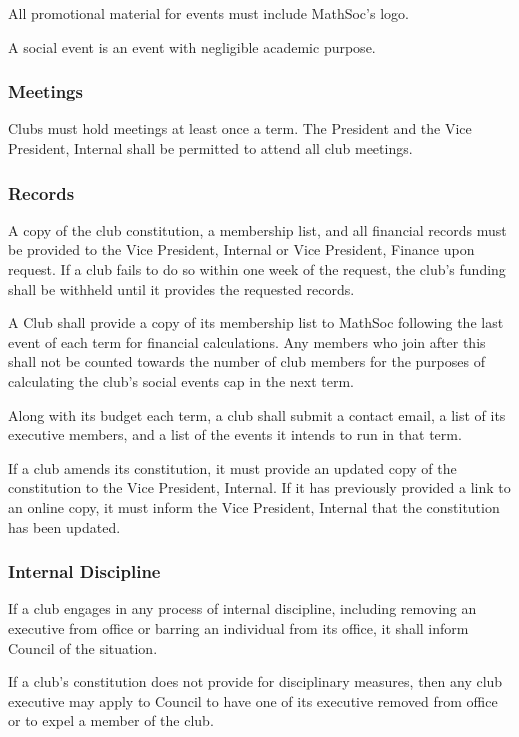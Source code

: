 All promotional material for events must include MathSoc's logo.

A social event is an event with negligible academic purpose.

\subsubsection{Meetings}
Clubs must hold meetings at least once a term. The President and the Vice
President, Internal shall be permitted to attend all club meetings.

\subsubsection{Records}
A copy of the club constitution, a membership list, and all financial records
must be provided to the Vice President, Internal or Vice President, Finance
upon request. If a club fails to do so within one week of the request, the
club's funding shall be withheld until it provides the requested records.

A Club shall provide a copy of its membership list to MathSoc following the
last event of each term for financial calculations. Any members who join after
this shall not be counted towards the number of club members for the purposes
of calculating the club's social events cap in the next term.

Along with its budget each term, a club shall submit a contact email, a list of
its executive members, and a list of the events it intends to run in that term.

If a club amends its constitution, it must provide an updated copy of the
constitution to the Vice President, Internal. If it has previously provided a
link to an online copy, it must inform the Vice President, Internal that the
constitution has been updated.

\subsubsection{Internal Discipline}
If a club engages in any process of internal discipline, including removing an
executive from office or barring an individual from its office, it shall inform
Council of the situation.

If a club's constitution does not provide for disciplinary measures, then any
club executive may apply to Council to have one of its executive removed from
office or to expel a member of the club.

